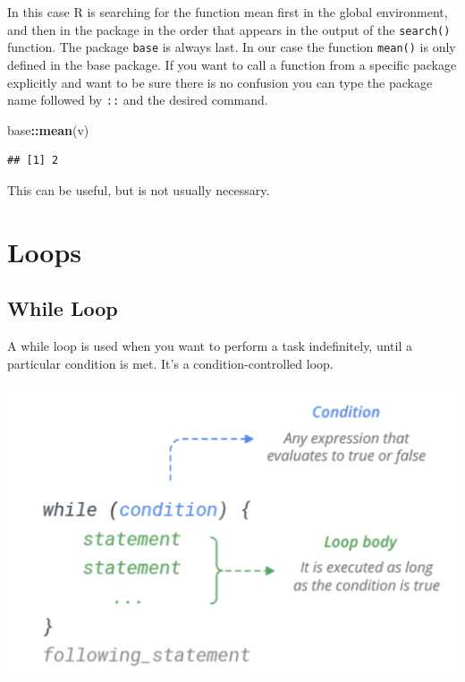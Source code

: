 \documentclass[
]{book}
\newenvironment{Shaded}{\begin{snugshade}}{\end{snugshade}}
\newcommand{\KeywordTok}[1]{\textcolor[rgb]{0.13,0.29,0.53}{\textbf{#1}}}
\newcommand{\NormalTok}[1]{#1}
\newcommand{\OperatorTok}[1]{\textcolor[rgb]{0.81,0.36,0.00}{\textbf{#1}}}
\begin{document}
In this case R is searching for the function mean first in the global environment, and then in the package in the order that appears in the output of the \texttt{search()} function. The package \texttt{base} is always last. In our case the function \texttt{mean()} is only defined in the base package. If you want to call a function from a specific package explicitly and want to be sure there is no confusion you can type the package name followed by \texttt{::} and the desired command.

\begin{Shaded}
\begin{Highlighting}[]
\NormalTok{base}\OperatorTok{::}\KeywordTok{mean}\NormalTok{(v)}
\end{Highlighting}
\end{Shaded}

\begin{verbatim}
## [1] 2
\end{verbatim}

This can be useful, but is not usually necessary.

\hypertarget{loops}{%
\chapter{Loops}\label{loops}}

\hypertarget{while-loop}{%
\section{While Loop}\label{while-loop}}

A while loop is used when you want to perform a task indefinitely, until a particular condition is met. It's a condition-controlled loop.

\includegraphics[width=14.5in]{images/WhileLoop}
\end{document}
